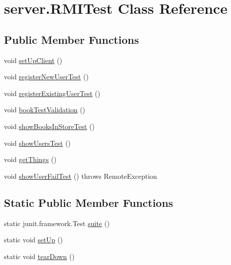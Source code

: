 \hypertarget{classserver_1_1_r_m_i_test}{}\section{server.\+R\+M\+I\+Test Class Reference}
\label{classserver_1_1_r_m_i_test}
\subsection*{Public Member Functions}
\begin{DoxyCompactItemize}
\item 
void \hyperlink{classserver_1_1_r_m_i_test_afa84bf10a728f823fac69db153b1c3e7}{set\+Up\+Client} ()
\item 
void \hyperlink{classserver_1_1_r_m_i_test_ac9e55699ef63db0bf72493ced80157fb}{register\+New\+User\+Test} ()
\item 
void \hyperlink{classserver_1_1_r_m_i_test_a7553f5b5e7d2b250abfd675bd5cb9428}{register\+Existing\+User\+Test} ()
\item 
void \hyperlink{classserver_1_1_r_m_i_test_a97c45d5c0c201e134f55458289f1a189}{book\+Test\+Validation} ()
\item 
void \hyperlink{classserver_1_1_r_m_i_test_a9229c65573d1e487439fa0deacde9d35}{show\+Books\+In\+Store\+Test} ()
\item 
void \hyperlink{classserver_1_1_r_m_i_test_a47e723272e2b510190efc5342d478757}{show\+Users\+Test} ()
\item 
void \hyperlink{classserver_1_1_r_m_i_test_abde374312c6ab45dfac4abf722472910}{get\+Things} ()
\item 
void \hyperlink{classserver_1_1_r_m_i_test_a9e1541bcb7b6629caf2462f1d89b164e}{show\+User\+Fail\+Test} ()  throws Remote\+Exception
\end{DoxyCompactItemize}
\subsection*{Static Public Member Functions}
\begin{DoxyCompactItemize}
\item 
static junit.\+framework.\+Test \hyperlink{classserver_1_1_r_m_i_test_a66cf8d2b5563f466516d5d5addd874df}{suite} ()
\item 
static void \hyperlink{classserver_1_1_r_m_i_test_a9b395f99eaaa51d877c3a505294e0fe8}{set\+Up} ()
\item 
static void \hyperlink{classserver_1_1_r_m_i_test_af542aed2dc3097307cfc2e0b5bec3c95}{tear\+Down} ()
\end{DoxyCompactItemize}


